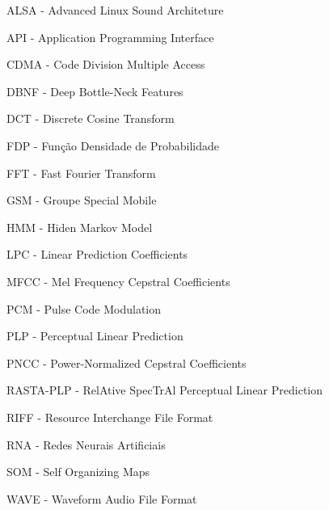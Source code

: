 \begin{acronym}

\item ALSA - Advanced Linux Sound Architeture
\item API - Application Programming Interface


\item CDMA - Code Division Multiple Access

\item DBNF - Deep Bottle-Neck Features 
\item DCT - Discrete Cosine Transform

\item FDP - Função Densidade de Probabilidade
\item FFT - Fast Fourier Transform
\item GSM - Groupe Special Mobile 
\item HMM - Hiden Markov Model



\item LPC - Linear Prediction Coefficients
\item MFCC - Mel Frequency Cepstral Coefficients



\item PCM - Pulse Code Modulation
\item PLP -  Perceptual Linear Prediction
\item PNCC - Power-Normalized Cepstral Coefficients 

\item RASTA-PLP - RelAtive SpecTrAl  Perceptual Linear Prediction
\item RIFF - Resource Interchange File Format
\item RNA - Redes Neurais Artificiais
\item SOM - Self Organizing Maps


\item WAVE - Waveform Audio File Format




\end{acronym}